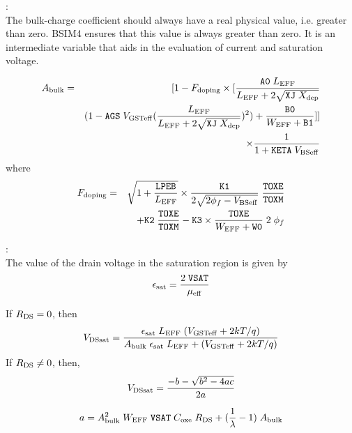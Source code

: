 \documentclass{article}
\begin{document}
:\\
The bulk-charge coefficient should always have a real physical
value, i.e. greater than zero. BSIM4 ensures that this value is
always greater than zero. It is an intermediate variable that aids
in the evaluation of current and saturation voltage.

\begin{eqnarray}
A_{\rm{bulk}} & = & [1 - F_{\rm{doping}} \times
[{\texttt{A0}\;L_{\rm{EFF}} \over
L_{\rm{EFF}} + 2\sqrt{\texttt{XJ}\;X_{\rm{dep}}}} \nonumber \\
           & & (1 - \texttt{AGS}\;V_{\rm{GSTeff}}({L_{\rm{EFF}} \over
L_{\rm{EFF}} + 2\sqrt{\texttt{XJ}\;X_{\rm{dep}}}})^2) + {\texttt{B0} \over W_{\rm{EFF}} + \texttt{B1}}]] \nonumber \\
           & & \times {1 \over 1 + \texttt{KETA}\;V_{\rm{BSeff}}}
\end{eqnarray}
where
\begin{eqnarray}
F_{\rm{doping}} & = & \sqrt{1 + {\texttt{LPEB} \over
L_{\rm{EFF}}}} \times {\texttt{K1} \over 2\sqrt{2\phi_f -
V_{\rm{BSeff}}}} \;{\texttt{TOXE}
\over {\texttt{TOXM}}}  \nonumber \\
             & & + \texttt{K2}\;{\texttt{TOXE} \over \texttt{TOXM}} - \texttt{K3} \times
             {\texttt{TOXE} \over W_{\rm{EFF}} + \texttt{W0}}\; 2\;\phi_f
\end{eqnarray}

:\\
The value of the drain voltage in the saturation region is given
by
\begin{equation}
\epsilon_{\rm{sat}} = {2\; \texttt{VSAT} \over \mu_{\rm{eff}}}
\end{equation}

\noindent If $R_{\rm{DS}} = 0$, then
\begin{equation}
V_{\rm{DSsat}} = {\epsilon_{\rm{sat}}\; L_{\rm{EFF}}\;
(V_{\rm{GSTeff}} + 2kT/q) \over A_{\rm{bulk}}\;
\epsilon_{\rm{sat}} \; L_{\rm{EFF}} + (V_{\rm{GSTeff}} + 2kT/q)}
\end{equation}
\noindent If $R_{\rm{DS}} \neq 0$, then,
\begin{equation}
V_{\rm{DSsat}} = {-b -\sqrt{b^2 - 4ac} \over 2a}
\end{equation}

\begin{equation}
a = A_{\rm{bulk}}^2 \; W_{\rm{EFF}} \;\texttt{VSAT} \;C_{\rm{oxe}}
\;R_{\rm{DS}} + ({1 \over \lambda} - 1) \;A_{\rm{bulk}}
\end{equation}
\end{document}
